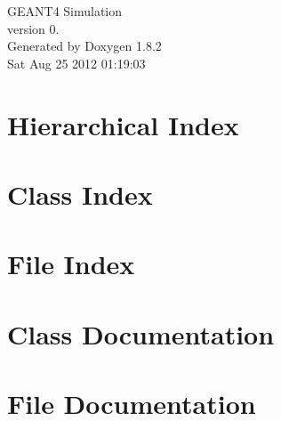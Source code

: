 \documentclass{book}
\begin{document}
\hypersetup{pageanchor=false,citecolor=blue}
\begin{titlepage}
\vspace*{7cm}
\begin{center}
{\Large G\-E\-A\-N\-T4 Simulation \\[1ex]\large version 0. }\\
\vspace*{1cm}
{\large Generated by Doxygen 1.8.2}\\
\vspace*{0.5cm}
{\small Sat Aug 25 2012 01:19:03}\\
\end{center}
\end{titlepage}
\clearemptydoublepage
{}
\tableofcontents
\clearemptydoublepage
{}
\hypersetup{pageanchor=true,citecolor=blue}
\chapter{Hierarchical Index}

\chapter{Class Index}

\chapter{File Index}

\chapter{Class Documentation}





\chapter{File Documentation}











\printindex
\end{document}
